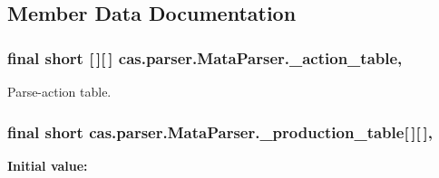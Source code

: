 \subsection{Member Data Documentation}
\hypertarget{classcas_1_1parser_1_1_mata_parser_a8d0afaf46e35b1827bb263d8d27bc747}{
\subsubsection[{\-\_\-action\-\_\-table}]{\setlength{\rightskip}{0pt plus 5cm}final short \mbox{[}$\,$\mbox{]}\mbox{[}$\,$\mbox{]} cas.\-parser.\-Mata\-Parser.\-\_\-action\-\_\-table\hspace{0.3cm}{\ttfamily [static]}, {\ttfamily [protected]}}}\label{classcas_1_1parser_1_1_mata_parser_a8d0afaf46e35b1827bb263d8d27bc747}
Parse-\/action table. \hypertarget{classcas_1_1parser_1_1_mata_parser_a4ef6a5f2a08db3c2e752b4fd24ac5dad}{
\subsubsection[{\-\_\-production\-\_\-table}]{\setlength{\rightskip}{0pt plus 5cm}final short cas.\-parser.\-Mata\-Parser.\-\_\-production\-\_\-table\mbox{[}$\,$\mbox{]}\mbox{[}$\,$\mbox{]}\hspace{0.3cm}{\ttfamily [static]}, {\ttfamily [protected]}}}\label{classcas_1_1parser_1_1_mata_parser_a4ef6a5f2a08db3c2e752b4fd24ac5dad}
{\bfseries Initial value\-:}
